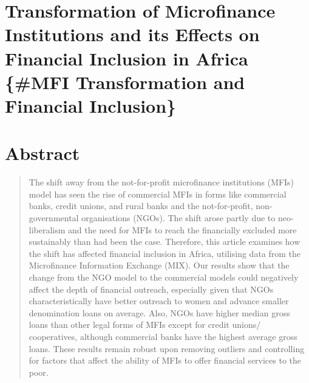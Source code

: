 \documentclass[a4paper,nobind]{templates/ociamthesis}
\begin{document}
\setlength{\textbaselineskip}{22pt plus2pt}

\setlength{\parskip}{2pt plus 1pt}

\setlength{\baselineskip}{\textbaselineskip}

\hypertarget{transformation-of-microfinance-institutions-and-its-effects-on-financial-inclusion-in-africa-mfi-transformation-and-financial-inclusion}{%
\section{Transformation of Microfinance Institutions and its Effects on Financial Inclusion in Africa \{\#MFI Transformation and Financial Inclusion\}}\label{transformation-of-microfinance-institutions-and-its-effects-on-financial-inclusion-in-africa-mfi-transformation-and-financial-inclusion}}

\minitoc 

\hypertarget{abstract}{%
\section{\texorpdfstring{\textbf{Abstract}}{Abstract}}\label{abstract}}

\begin{quote}
The shift away from the not-for-profit microfinance institutions (MFIs) model has seen the rise of commercial MFIs in forms like commercial banks, credit unions, and rural banks and the not-for-profit, non-governmental organisations (NGOs). The shift arose partly due to neo-liberalism and the need for MFIs to reach the financially excluded more sustainably than had been the case. Therefore, this article examines how the shift has affected financial inclusion in Africa, utilising data from the Microfinance Information Exchange (MIX). Our results show that the change from the NGO model to the commercial models could negatively affect the depth of financial outreach, especially given that NGOs characteristically have better outreach to women and advance smaller denomination loans on average. Also, NGOs have higher median gross loans than other legal forms of MFIs except for credit unions/ cooperatives, although commercial banks have the highest average gross loans. These results remain robust upon removing outliers and controlling for factors that affect the ability of MFIs to offer financial services to the poor.
\end{quote}
\end{document}
